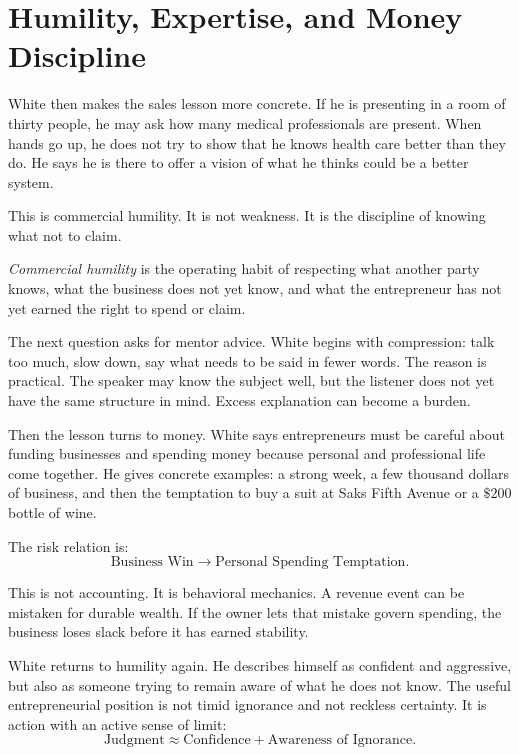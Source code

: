 \section{Humility, Expertise, and Money Discipline}

White then makes the sales lesson more concrete. If he is presenting in a room of thirty people, he may ask how many medical professionals are present. When hands go up, he does not try to show that he knows health care better than they do. He says he is there to offer a vision of what he thinks could be a better system.

This is commercial humility. It is not weakness. It is the discipline of knowing what not to claim.

\begin{definition}
\emph{Commercial humility} is the operating habit of respecting what another party knows, what the business does not yet know, and what the entrepreneur has not yet earned the right to spend or claim.
\end{definition}

The next question asks for mentor advice. White begins with compression: talk too much, slow down, say what needs to be said in fewer words. The reason is practical. The speaker may know the subject well, but the listener does not yet have the same structure in mind. Excess explanation can become a burden.

Then the lesson turns to money. White says entrepreneurs must be careful about funding businesses and spending money because personal and professional life come together. He gives concrete examples: a strong week, a few thousand dollars of business, and then the temptation to buy a suit at Saks Fifth Avenue or a \(\$200\) bottle of wine.

The risk relation is:
\begin{equation}
\text{Business Win}
\longrightarrow
\text{Personal Spending Temptation}.
\end{equation}

This is not accounting. It is behavioral mechanics. A revenue event can be mistaken for durable wealth. If the owner lets that mistake govern spending, the business loses slack before it has earned stability.

White returns to humility again. He describes himself as confident and aggressive, but also as someone trying to remain aware of what he does not know. The useful entrepreneurial position is not timid ignorance and not reckless certainty. It is action with an active sense of limit:
\begin{equation}
\text{Judgment}
\approx
\text{Confidence}
+
\text{Awareness of Ignorance}.
\end{equation}

